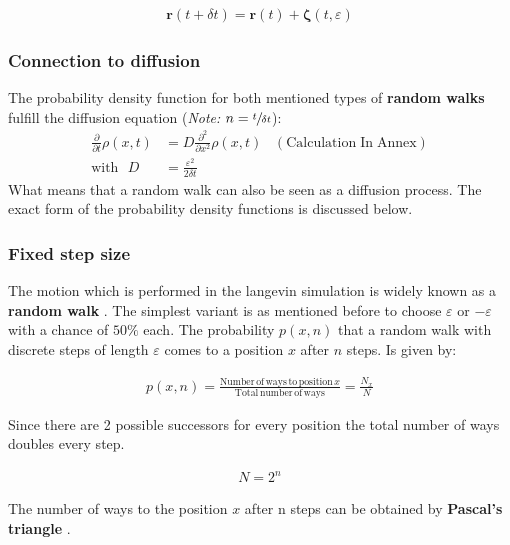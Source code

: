 \documentclass[a4paper, parskip=half]{scrartcl}
\newcommand{\effect}[1]{%
	\textbf{#1}%
}
\newcommand{\myEqLabel}[1]{\label{eq:#1}}
\newcommand{\myEqAnnex}[1]{\;\;\;\mathrm{(Calculation\;In\;Annex)} \myEqLabel{#1}}
\begin{document}
\begin{align}
\mathbf{r}(t + \delta t) = \mathbf{r}(t) + \boldsymbol{\zeta}(t, \varepsilon)
\end{align}

\subsubsection{Connection to diffusion}
The probability density function for both mentioned types of \effect{random walks} fulfill the diffusion equation (\textit{Note: }$n = \sfrac{t}{\delta t}$):
\begin{align}
\frac{\partial}{\partial t} \rho(x,t) &= D \frac{\partial^2}{\partial x^2 } \rho(x,t) \myEqAnnex{diffusion_PDE} \\
\mathrm{with} \, \, \,\, D &= \frac{\varepsilon^2}{2 \delta t} \myEqLabel{def:D}
\end{align}
What means that a random walk can also be seen as a diffusion process. The exact form of the probability density functions is discussed below.
\subsubsection{Fixed step size}
The motion which is performed in the langevin simulation is widely known as a \effect{random walk}. The simplest variant is as mentioned before to choose $\varepsilon$ or $-\varepsilon$ with a chance of $50\%$ each. The probability $p(x, n)$ that a random walk with discrete steps of length $\varepsilon$ comes to a position $x$ after $n$ steps. Is given by:

\begin{align}
p(x, n) = \frac{\mathrm{Number\, of\, ways\, to\, position\,} x}{\mathrm{Total\, number\, of\, ways}} = \frac{N_x}{N}
\end{align}

Since there are 2 possible successors for every position the total number of ways  doubles every step.

\begin{align}
N = 2^n
\end{align}

The number of ways to the position $x$ after n steps can be obtained by \effect{Pascal's triangle}.
\end{document}
